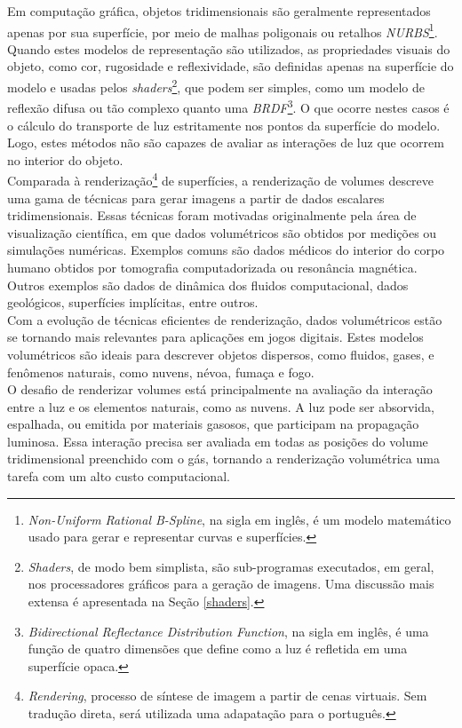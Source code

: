 Em computação gráfica, objetos tridimensionais são geralmente representados apenas por sua superfície, por meio de malhas poligonais ou retalhos \emph{NURBS}\footnote{\emph{Non-Uniform Rational B-Spline}, na sigla em inglês, é um modelo matemático usado para gerar e representar curvas e superfícies.}. Quando estes modelos de representação são utilizados, as propriedades visuais do objeto, como cor, rugosidade e reflexividade, são definidas apenas na superfície do modelo e usadas pelos \emph{shaders}\footnote{\emph{Shaders}, de modo bem simplista, são sub-programas executados, em geral, nos processadores gráficos para a geração de imagens. Uma discussão mais extensa é apresentada na Seção \ref{shaders}.}, que podem ser simples, como um modelo de reflexão difusa ou tão complexo quanto uma \emph{BRDF}\footnote{\emph{Bidirectional Reflectance Distribution Function}, na sigla em inglês, é uma função de quatro dimensões que define como a luz é refletida em uma superfície opaca.}. O que ocorre nestes casos é o cálculo do transporte de luz estritamente nos pontos da superfície do modelo. Logo, estes métodos não são capazes de avaliar as interações de luz que ocorrem no interior do objeto. \\


Comparada à renderização\footnote{\emph{Rendering}, processo de síntese de imagem a partir de cenas virtuais. Sem tradução direta, será utilizada uma adapatação para o português. } de superfícies, a renderização de volumes descreve uma gama de técnicas para gerar imagens a partir de dados escalares tridimensionais. Essas técnicas foram motivadas originalmente pela área de visualização científica, em que dados volumétricos são obtidos por medições ou simulações numéricas. Exemplos comuns são dados médicos do interior do corpo humano obtidos por tomografia computadorizada ou resonância magnética. Outros exemplos são dados de dinâmica dos fluidos computacional, dados geológicos, superfícies implícitas, entre outros. \\


Com a evolução de técnicas eficientes de renderização, dados volumétricos estão se tornando mais relevantes para aplicações em jogos digitais. Estes modelos volumétricos são ideais para descrever objetos dispersos, como fluidos, gases, e fenômenos naturais, como nuvens, névoa, fumaça e fogo. \\

O desafio de renderizar volumes está principalmente na avaliação da interação entre a luz e os elementos naturais, como as nuvens. A luz pode ser absorvida, espalhada, ou emitida por materiais gasosos, que participam na propagação luminosa. Essa interação precisa ser avaliada em todas as posições do volume tridimensional preenchido com o gás, tornando a renderização volumétrica uma tarefa com um alto custo computacional. 

